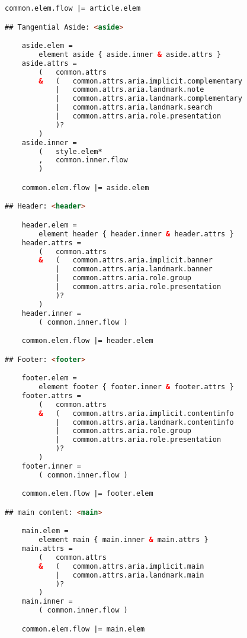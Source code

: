 \begin{lstlisting}[language=HTML]
	common.elem.flow |= article.elem

## Tangential Aside: <aside>

	aside.elem =
		element aside { aside.inner & aside.attrs }
	aside.attrs =
		(	common.attrs
		&	(	common.attrs.aria.implicit.complementary
			|	common.attrs.aria.landmark.note
			|	common.attrs.aria.landmark.complementary
			|	common.attrs.aria.landmark.search
			|	common.attrs.aria.role.presentation
			)?
		)
	aside.inner =
		(	style.elem*
		,	common.inner.flow 
		)

	common.elem.flow |= aside.elem

## Header: <header>

	header.elem =
		element header { header.inner & header.attrs }
	header.attrs =
		(	common.attrs
		&	(	common.attrs.aria.implicit.banner
			|	common.attrs.aria.landmark.banner
			|	common.attrs.aria.role.group
			|	common.attrs.aria.role.presentation
			)?
		)
	header.inner =
		( common.inner.flow )

	common.elem.flow |= header.elem

## Footer: <footer>

	footer.elem =
		element footer { footer.inner & footer.attrs }
	footer.attrs =
		(	common.attrs
		&	(	common.attrs.aria.implicit.contentinfo
			|	common.attrs.aria.landmark.contentinfo
			|	common.attrs.aria.role.group
			|	common.attrs.aria.role.presentation
			)?
		)
	footer.inner =
		( common.inner.flow )

	common.elem.flow |= footer.elem

## main content: <main>

	main.elem =
		element main { main.inner & main.attrs }
	main.attrs =
		(	common.attrs
		&	(	common.attrs.aria.implicit.main
			|	common.attrs.aria.landmark.main
			)?
		)
	main.inner =
		( common.inner.flow )

	common.elem.flow |= main.elem
\end{lstlisting}